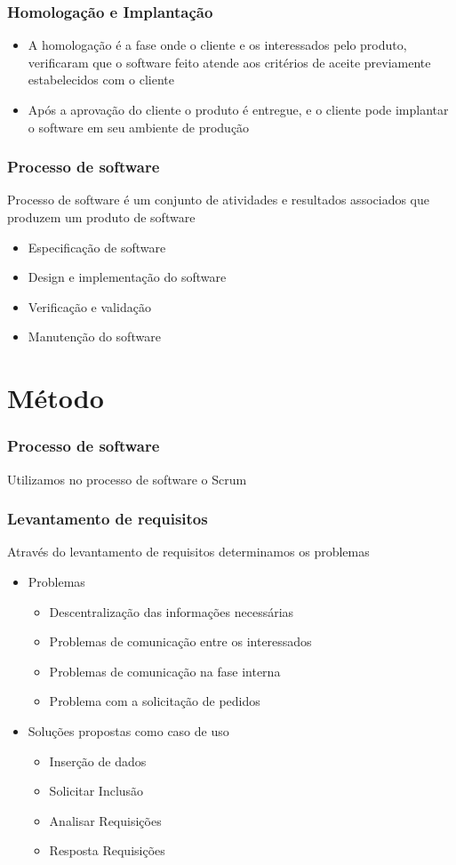 \documentclass{beamer}
\begin{document}
	\begin{frame}\frametitle{Homologação e Implantação}
		\begin{itemize}
		\item A homologação é a fase onde o cliente e os interessados pelo produto, verificaram que o software feito atende aos critérios de aceite previamente estabelecidos com o cliente
		\item Após a aprovação do cliente o produto é entregue, e o cliente pode implantar o software em seu ambiente de produção
		\end{itemize}
	\end{frame}

	\begin{frame}\frametitle{Processo de software}
		Processo de software é um conjunto de atividades e resultados associados que produzem um produto de software
		\begin{itemize}
			\item Especificação de software
			\item Design e implementação do software
			\item Verificação e validação
			\item Manutenção do software
		\end{itemize}
	\end{frame}

	\section{Método}
	
		\begin{frame}\frametitle{Processo de software}
			
			Utilizamos no processo de software o Scrum
		\end{frame}
	
		\begin{frame}\frametitle{Levantamento de requisitos}
			Através do levantamento de requisitos determinamos os problemas
			\begin{itemize}
				\item Problemas
				\begin{itemize}
					\item Descentralização das informações necessárias
					\item Problemas de comunicação entre os interessados
					\item Problemas de comunicação na fase interna
					\item Problema com a solicitação de pedidos
				\end{itemize}					
				\item Soluções propostas como caso de uso
				\begin{itemize}
					\item Inserção de dados
					\item Solicitar Inclusão
					\item Analisar Requisições
					\item Resposta Requisições
				\end{itemize}
			\end{itemize}
		\end{frame}
	
\end{document}
